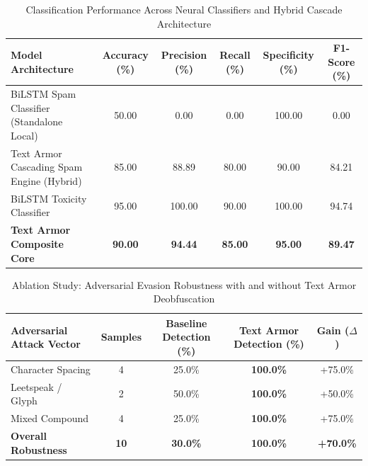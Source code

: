 
\begin{table}[htbp]
\centering
\caption{Classification Performance Across Neural Classifiers and Hybrid Cascade Architecture}
\label{tab:classification_performance}
\begin{tabular}{lccccc}
\hline
\textbf{Model Architecture} & \textbf{Accuracy (\%)} & \textbf{Precision (\%)} & \textbf{Recall (\%)} & \textbf{Specificity (\%)} & \textbf{F1-Score (\%)} \\
\hline
BiLSTM Spam Classifier (Standalone Local)  & 50.00 & 0.00 & 0.00 & 100.00 & 0.00 \\
Text Armor Cascading Spam Engine (Hybrid)  & 85.00 & 88.89 & 80.00 & 90.00 & 84.21 \\
BiLSTM Toxicity Classifier                 & 95.00 & 100.00 & 90.00 & 100.00 & 94.74 \\
\hline
\textbf{Text Armor Composite Core}       & \textbf{90.00} & \textbf{94.44} & \textbf{85.00} & \textbf{95.00} & \textbf{89.47} \\
\hline
\end{tabular}
\end{table}

\begin{table}[htbp]
\centering
\caption{Ablation Study: Adversarial Evasion Robustness with and without Text Armor Deobfuscation}
\label{tab:adversarial_ablation}
\begin{tabular}{lcccc}
\hline
\textbf{Adversarial Attack Vector} & \textbf{Samples} & \textbf{Baseline Detection (\%)} & \textbf{Text Armor Detection (\%)} & \textbf{Gain ($\Delta$)} \\
\hline
Character Spacing              & 4 & 25.0\% & \textbf{100.0\%} & +75.0\% \\
Leetspeak / Glyph              & 2 & 50.0\% & \textbf{100.0\%} & +50.0\% \\
Mixed Compound                 & 4 & 25.0\% & \textbf{100.0\%} & +75.0\% \\
\hline
\textbf{Overall Robustness} & \textbf{10} & \textbf{30.0\%} & \textbf{100.0\%} & \textbf{+70.0\%} \\
\hline
\end{tabular}
\end{table}


